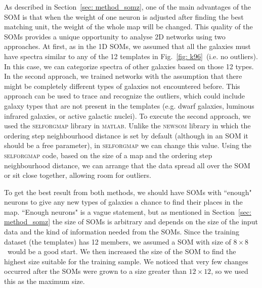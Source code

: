         As described in Section~\ref{sec: method_somz}, one of the main advantages of the SOM is that when the weight of one neuron is adjusted after finding the best matching unit, the weight of the whole map will be changed.
        This quality of the SOMs provides a unique opportunity to analyse 2D networks using two approaches. 
        At first, as in the 1D SOMs, we assumed that all the galaxies must have spectra similar to any of the 12 templates in Fig.~\ref{fig: k96}~(i.e. no outliers).
        In this case, we can categorize spectra of other galaxies based on those 12 types.
        In the second approach, we trained networks with the assumption that there might be completely different types of galaxies not encountered before.
        This approach can be used to trace and recognize the outliers, which could include galaxy types that are not present in the  templates (e.g. dwarf galaxies, luminous infrared galaxies, or active galactic nuclei).
        To execute the second approach, we used the \textsc{selforgmap} library in \textsc{matlab}.
        Unlike the \textsc{newsom} library in which the ordering step neighbourhood distance is set by default (although in an SOM it should be a free parameter), in \textsc{selforgmap} we can change this value.
        Using the \textsc{selforgmap} code, based on the size of a map and the ordering step neighbourhood distance, we can arrange that the data spread all over the SOM or sit close together, allowing room for outliers.

        To get the best result from both methods, we should have SOMs with ``enough"  neurons to give any new types of galaxies a chance to find their places in the map.
        ``Enough neurons" is a vague statement, but as mentioned in Section~\ref{sec: method_somz} the size of SOMs is arbitrary and depends on the size of the input data and the kind of information needed from the SOMs.
        Since the training dataset (the  templates) has 12 members, we assumed a SOM with size of $8\times8$~would be a good start.
        We then increased the size of the SOM to find the highest size suitable for the training sample.
        We noticed that very few changes occurred after the SOMs were grown to a size greater than $12\times12$, so we used this as the maximum size.
    
